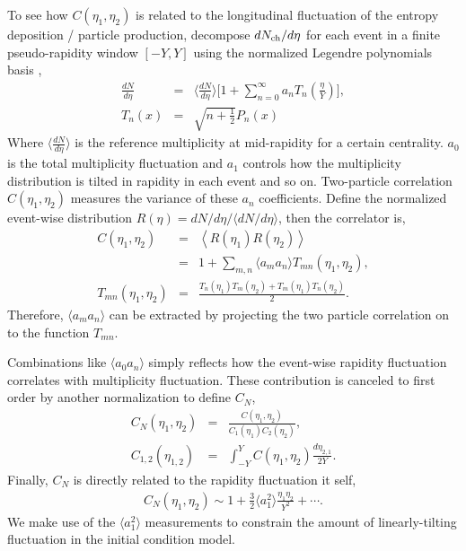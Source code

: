 To see how $C(\eta_1, \eta_2)$ is related to the longitudinal fluctuation of the entropy deposition / particle production, decompose $dN_\text{ch}/d\eta$ for each event in a finite pseudo-rapidity window $[-Y, Y]$ using the normalized Legendre polynomials basis \cite{Bzdak:2012tp, Jia:2015jga, ATLAS:2015kla},
\begin{eqnarray}
\frac{dN}{d\eta} &=& \biggl\langle\frac{dN}{d\eta}\biggr\rangle \biggl[1 + \sum_{n=0}^\infty a_n T_n\left(\frac{\eta}{Y}\right) \biggr],\\
T_n(x) &=& \sqrt{n + \frac{1}{2}} P_n(x)
\end{eqnarray}
Where $\langle\frac{dN}{d\eta}\rangle$ is the reference multiplicity at mid-rapidity for a certain centrality.
$a_0$ is the total multiplicity fluctuation and $a_1$ controls how the multiplicity distribution is tilted in rapidity in each event and so on.
Two-particle correlation $C(\eta_1, \eta_2)$ measures the variance of these $a_n$ coefficients.
Define the normalized event-wise distribution $R(\eta) = dN/d\eta /\langle dN/d\eta\rangle$, then the correlator is,
\begin{eqnarray}
C(\eta_1, \eta_2) &=& \left\langle R(\eta_1) R(\eta_2)\right\rangle \\
&=& 1 + \sum_{m, n}\langle a_m a_n\rangle  T_{mn}(\eta_1, \eta_2),\\
T_{mn}(\eta_1, \eta_2) &=& \frac{T_n(\eta_1)T_m(\eta_2) + T_m(\eta_1)T_n(\eta_2)}{2}.
\end{eqnarray}
Therefore, $\langle a_m a_n\rangle$ can be extracted by projecting the two particle correlation on to the function $T_{mn}$.

Combinations like $\langle a_0 a_n\rangle$ simply reflects how the event-wise rapidity fluctuation correlates with multiplicity fluctuation. 
These contribution is canceled to first order by another normalization to define $C_N$,
\begin{eqnarray}
 C_N(\eta_1, \eta_2) &=& \frac{C(\eta_1, \eta_2)}{C_1(\eta_1)C_2(\eta_2)},\\
C_{1,2}(\eta_{1,2}) &=& \int_{-Y}^{Y}C(\eta_1, \eta_2)\frac{d\eta_{2,1}}{2Y}.
\end{eqnarray}
Finally, $C_N$ is directly related to the rapidity fluctuation it self,
\begin{eqnarray}
C_N(\eta_1, \eta_2) \sim 1 + \frac{3}{2}\langle a_1 ^2 \rangle \frac{\eta_1\eta_2}{Y^2} + \cdots.
\end{eqnarray}
We make use of the $\langle a_1 ^2 \rangle$ measurements to constrain the amount of  linearly-tilting fluctuation in the initial condition model.

